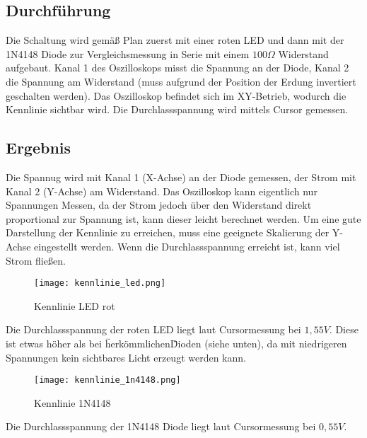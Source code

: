 \documentclass[12pt,a4paper,titlepage]{article}
\begin{document}
\subsection{Durchführung}
Die Schaltung wird gemäß Plan zuerst mit einer roten LED und dann mit der 1N4148 Diode zur Vergleichsmessung in Serie mit einem $100\Omega$ Widerstand aufgebaut. Kanal 1 des Oszilloskops misst die Spannung an der Diode, Kanal 2 die Spannung am Widerstand (muss aufgrund der Position der Erdung invertiert geschalten werden). Das Oszilloskop befindet sich im XY-Betrieb, wodurch die Kennlinie sichtbar wird. Die Durchlassspannung wird mittels Cursor gemessen.

\subsection{Ergebnis}
Die Spannug wird mit Kanal 1 (X-Achse) an der Diode gemessen, der Strom mit Kanal 2 (Y-Achse) am Widerstand. Das Oszilloskop kann eigentlich nur Spannungen Messen, da der Strom jedoch über den Widerstand direkt proportional zur Spannung ist, kann dieser leicht berechnet werden. Um eine gute Darstellung der Kennlinie zu erreichen, muss eine geeignete Skalierung der Y-Achse eingestellt werden. Wenn die Durchlassspannung erreicht ist, kann viel Strom fließen.

\begin{figure}[H]
  \centering
  \texttt{[image: kennlinie\_led.png]}
  \caption{Kennlinie LED rot}
\end{figure}

Die Durchlassspannung der roten LED liegt laut Cursormessung bei $1,55V$. Diese ist etwas höher als bei \"herkömmlichen\" Dioden (siehe unten), da mit niedrigeren Spannungen kein sichtbares Licht erzeugt werden kann.

\begin{figure}[H]
  \centering
  \texttt{[image: kennlinie\_1n4148.png]}
  \caption{Kennlinie 1N4148}
\end{figure}

Die Durchlassspannung der 1N4148 Diode liegt laut Cursormessung bei $0,55V$.
\end{document}
